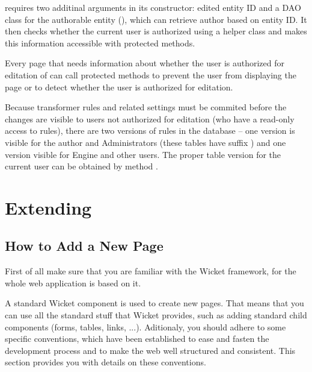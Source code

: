  requires two additinal arguments in its constructor: edited entity ID and a DAO class for the authorable entity (), which can retrieve author based on entity ID. It then checks whether the current user is authorized using a helper class  and makes this information accessible with protected methods.

Every page that needs information about whether the user is authorized for editation of can call protected methods  to prevent the user from displaying the page or  to detect whether the user is authorized for editation.

Because transformer rules and related settings must be commited before the changes are visible to  users not 
authorized for editation (who have a read-only access to rules), there are two versions of rules in the database -- one version is visible for the author and Administrators (these tables have suffix ) and one version visible for Engine and other users. The proper table version for the current user can be obtained by method .

\code{}

\section{Extending}

\subsection{How to Add a New Page}
\label{sec:howToAddANewPage}

First of all make sure that you are familiar with the Wicket framework, for the whole web application is based on it.

A standard Wicket  component is used to create new pages. That means that you can use all the standard stuff that Wicket provides, such as adding standard child components (forms, tables, links, ...). Aditionaly, you should adhere to some specific conventions, which have been established to ease and fasten the development process and to make the web well structured and consistent. This section provides you with details on these conventions.

